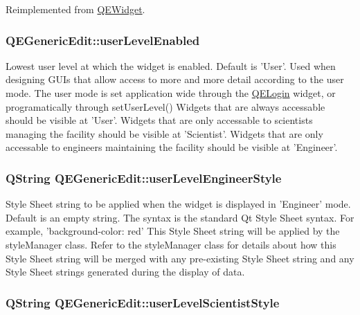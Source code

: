 Reimplemented from \hyperlink{classQEWidget}{QEWidget}.

\hypertarget{classQEGenericEdit_ae18520d83fec62603db7e658efe00e3c}{
\subsubsection[{userLevelEnabled}]{ QEGenericEdit::userLevelEnabled}}
\label{classQEGenericEdit_ae18520d83fec62603db7e658efe00e3c}
Lowest user level at which the widget is enabled. Default is 'User'. Used when designing GUIs that allow access to more and more detail according to the user mode. The user mode is set application wide through the \hyperlink{classQELogin}{QELogin} widget, or programatically through setUserLevel() Widgets that are always accessable should be visible at 'User'. Widgets that are only accessable to scientists managing the facility should be visible at 'Scientist'. Widgets that are only accessable to engineers maintaining the facility should be visible at 'Engineer'. \hypertarget{classQEGenericEdit_ab4d7c33ffbce0d809dc4fc078e99f924}{
\subsubsection[{userLevelEngineerStyle}]{\setlength{\rightskip}{0pt plus 5cm}QString QEGenericEdit::userLevelEngineerStyle}}
\label{classQEGenericEdit_ab4d7c33ffbce0d809dc4fc078e99f924}
Style Sheet string to be applied when the widget is displayed in 'Engineer' mode. Default is an empty string. The syntax is the standard Qt Style Sheet syntax. For example, 'background-\/color: red' This Style Sheet string will be applied by the styleManager class. Refer to the styleManager class for details about how this Style Sheet string will be merged with any pre-\/existing Style Sheet string and any Style Sheet strings generated during the display of data. \hypertarget{classQEGenericEdit_a98fef02145d98961debe3cdc8fa8cb9c}{
\subsubsection[{userLevelScientistStyle}]{\setlength{\rightskip}{0pt plus 5cm}QString QEGenericEdit::userLevelScientistStyle}}

